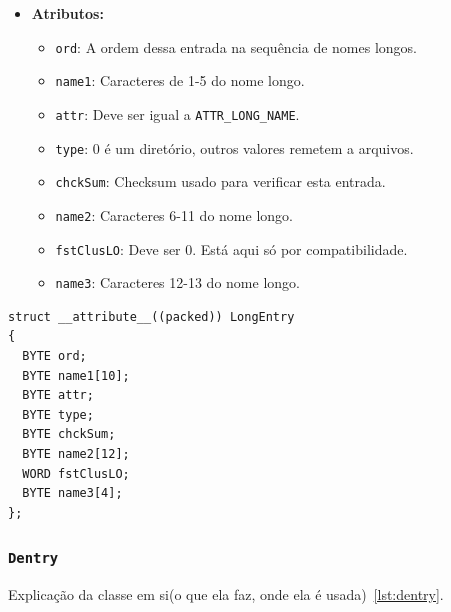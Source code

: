 \documentclass[
    12pt,				%
    oneside,   	        %
    a4paper,			%
    english,			%
    french,				%
    spanish,			%
    brazil,				%
    ]{pacotes/abntex2}
\begin{document}
\begin{itemize}
    \item \textbf{Atributos:}
        \begin{itemize}
            \item \texttt{ord}: A ordem dessa entrada na sequência de nomes longos.
            \item \texttt{name1}: Caracteres de 1-5 do nome longo.
            \item \texttt{attr}: Deve ser igual a \texttt{ATTR\_LONG\_NAME}.
            \item \texttt{type}: 0 é um diretório, outros valores remetem a arquivos.
            \item \texttt{chckSum}: Checksum usado para verificar esta entrada.
            \item \texttt{name2}: Caracteres 6-11 do nome longo.
            \item \texttt{fstClusLO}: Deve ser 0. Está aqui só por compatibilidade.
            \item \texttt{name3}: Caracteres 12-13 do nome longo.
        \end{itemize}
\end{itemize}


\begin{lstlisting}[caption={Estrutura que representa uma entrada longa no sistema de arquivos}, label={lst:longentry}] 
struct __attribute__((packed)) LongEntry
{
  BYTE ord;
  BYTE name1[10];
  BYTE attr; 
  BYTE type; 
  BYTE chckSum; 
  BYTE name2[12];
  WORD fstClusLO; 
  BYTE name3[4]; 
};
\end{lstlisting}

\subsubsection{\texttt{Dentry}}
\label{subsubsec:dentry}

Explicação da classe em si(o que ela faz, onde ela é usada)~\ref{lst:dentry}.
\end{document}
